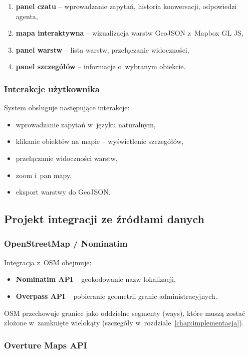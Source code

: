 \begin{enumerate}
    \item \textbf{panel czatu} -- wprowadzanie zapytań, historia konwersacji, odpowiedzi agenta,
    \item \textbf{mapa interaktywna} -- wizualizacja warstw GeoJSON z~Mapbox GL JS,
    \item \textbf{panel warstw} -- lista warstw, przełączanie widoczności,
    \item \textbf{panel szczegółów} -- informacje o~wybranym obiekcie.
\end{enumerate}

\subsubsection{Interakcje użytkownika}

System obsługuje następujące interakcje:
\begin{itemize}
    \item wprowadzanie zapytań w~języku naturalnym,
    \item klikanie obiektów na mapie -- wyświetlenie szczegółów,
    \item przełączanie widoczności warstw,
    \item zoom i~pan mapy,
    \item eksport warstwy do GeoJSON.
\end{itemize}

\subsection{Projekt integracji ze źródłami danych}

\subsubsection{OpenStreetMap / Nominatim}

Integracja z~OSM obejmuje:
\begin{itemize}
    \item \textbf{Nominatim API} -- geokodowanie nazw lokalizacji,
    \item \textbf{Overpass API} -- pobieranie geometrii granic administracyjnych.
\end{itemize}

OSM przechowuje granice jako oddzielne segmenty (ways), które muszą zostać złożone w~zamknięte wielokąty (szczegóły w~rozdziale~\ref{chap:implementacja}).

\subsubsection{Overture Maps API}


